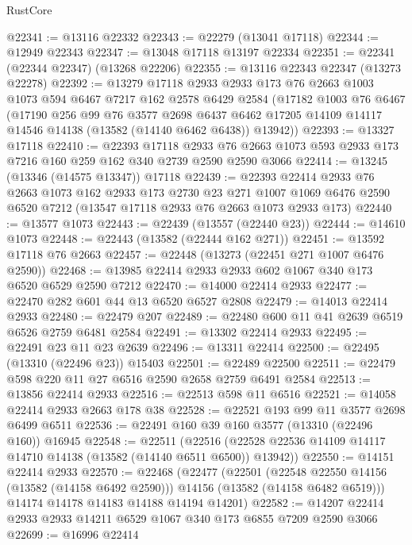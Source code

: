 \begin{lexlean}{RustCore}
\begin{coremodule}
@22341 := @13116 @22332
@22343 := @22279 (@13041 @17118)
@22344 := @12949 @22343
@22347 := @13048 @17118 @13197 @22334
@22351 := @22341 (@22344 @22347) (@13268 @22206)
@22355 := @13116 @22343 @22347 (@13273 @22278)
@22392 := @13279
    @17118
    @2933
    @2933
    @173
    @76
    @2663
    @1003
    @1073
    @594
    @6467
    @7217
    @162
    @2578
    @6429
    @2584
    (@17182
      @1003
      @76
      @6467
      (@17190
        @256
        @99
        @76
        @3577
        @2698
        @6437
        @6462
        @17205
        @14109
        @14117
        @14546
        @14138
        (@13582 (@14140 @6462 @6438))
        @13942))
@22393 := @13327 @17118
@22410 := @22393
    @17118
    @2933
    @76
    @2663
    @1073
    @593
    @2933
    @173
    @7216
    @160
    @259
    @162
    @340
    @2739
    @2590
    @2590
    @3066
@22414 := @13245 (@13346 (@14575 @13347)) @17118
@22439 := @22393
    @22414
    @2933
    @76
    @2663
    @1073
    @162
    @2933
    @173
    @2730
    @23
    @271
    @1007
    @1069
    @6476
    @2590
    @6520
    @7212
    (@13547 @17118 @2933 @76 @2663 @1073 @2933 @173)
@22440 := @13577 @1073
@22443 := @22439 (@13557 (@22440 @23))
@22444 := @14610 @1073
@22448 := @22443 (@13582 (@22444 @162 @271))
@22451 := @13592 @17118 @76 @2663
@22457 := @22448 (@13273 (@22451 @271 @1007 @6476 @2590))
@22468 := @13985 @22414 @2933 @2933 @602 @1067 @340 @173 @6520 @6529 @2590 @7212
@22470 := @14000 @22414 @2933
@22477 := @22470 @282 @601 @44 @13 @6520 @6527 @2808
@22479 := @14013 @22414 @2933
@22480 := @22479 @207
@22489 := @22480 @600 @11 @41 @2639 @6519 @6526 @2759 @6481 @2584
@22491 := @13302 @22414 @2933
@22495 := @22491 @23 @11 @23 @2639
@22496 := @13311 @22414
@22500 := @22495 (@13310 (@22496 @23)) @15403
@22501 := @22489 @22500
@22511 := @22479 @598 @220 @11 @27 @6516 @2590 @2658 @2759 @6491 @2584
@22513 := @13856 @22414 @2933
@22516 := @22513 @598 @11 @6516
@22521 := @14058 @22414 @2933 @2663 @178 @38
@22528 := @22521 @193 @99 @11 @3577 @2698 @6499 @6511
@22536 := @22491 @160 @39 @160 @3577 (@13310 (@22496 @160)) @16945
@22548 := @22511
    (@22516 (@22528 @22536 @14109 @14117 @14710 @14138 (@13582 (@14140 @6511 @6500)) @13942))
@22550 := @14151 @22414 @2933
@22570 := @22468
    (@22477
      (@22501
        (@22548 @22550 @14156 (@13582 (@14158 @6492 @2590)))
        @14156
        (@13582 (@14158 @6482 @6519)))
      @14174
      @14178
      @14183
      @14188
      @14194
      @14201)
@22582 := @14207 @22414 @2933 @2933 @14211 @6529 @1067 @340 @173 @6855 @7209 @2590 @3066
@22699 := @16996
    @22414

\end{coremodule}
\end{lexlean}

